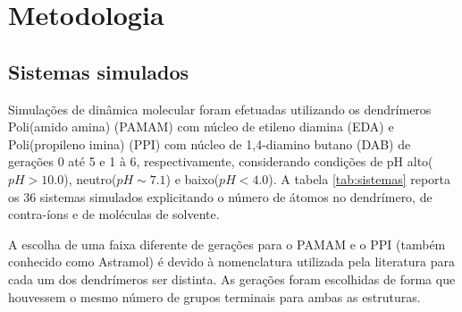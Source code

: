 \chapter{Metodologia}
\section{Sistemas simulados}\label{SistemasSimulados}

Simulações de dinâmica molecular foram efetuadas utilizando os dendrímeros Poli(amido amina) (PAMAM) com núcleo de etileno diamina (EDA) e Poli(propileno imina) (PPI) com núcleo de 1,4-diamino butano (DAB) de gerações 0 até 5 e 1 à 6, respectivamente, considerando condições de pH alto($pH > 10.0$), neutro($pH \sim 7.1$) e baixo($pH < 4.0$).
A tabela \ref{tab:sistemas} reporta os 36 sistemas simulados explicitando o número de átomos no dendrímero, de contra-íons e de moléculas de solvente.

A escolha de uma faixa diferente de gerações para o PAMAM e o PPI (também conhecido como Astramol\cite{Kabanov1999}) é devido à nomenclatura utilizada pela literatura para cada um dos dendrímeros ser distinta.
As gerações foram escolhidas de forma que houvessem o mesmo número de grupos terminais para ambas as estruturas.

